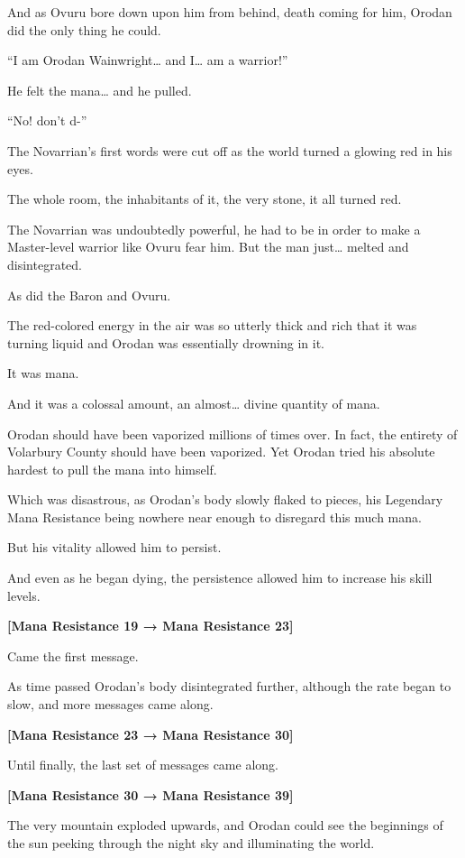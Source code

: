 \documentclass[a4paper,10pt]{book}
\begin{document}
And as Ovuru bore down upon him from behind, death coming for him, Orodan did the only thing he could.\par
“I am Orodan Wainwright… and I… am a warrior!”\par
He felt the mana… and he pulled.\par
“No! don’t d-”\par
The Novarrian’s first words were cut off as the world turned a glowing red in his eyes.\par
The whole room, the inhabitants of it, the very stone, it all turned red.\par
The Novarrian was undoubtedly powerful, he had to be in order to make a Master-level warrior like Ovuru fear him. But the man just… melted and disintegrated.\par
As did the Baron and Ovuru.\par
The red-colored energy in the air was so utterly thick and rich that it was turning liquid and Orodan was essentially drowning in it.\par
It was mana.\par
And it was a colossal amount, an almost… divine quantity of mana.\par
Orodan should have been vaporized millions of times over. In fact, the entirety of Volarbury County should have been vaporized. Yet Orodan tried his absolute hardest to pull the mana into himself.\par
Which was disastrous, as Orodan’s body slowly flaked to pieces, his Legendary Mana Resistance being nowhere near enough to disregard this much mana.\par
But his vitality allowed him to persist.\par
And even as he began dying, the persistence allowed him to increase his skill levels.\par
\textbf{[Mana Resistance 19 → Mana Resistance 23]}\par
Came the first message.\par
As time passed Orodan’s body disintegrated further, although the rate began to slow, and more messages came along.\par
\textbf{[Mana Resistance 23 → Mana Resistance 30]}\par
Until finally, the last set of messages came along.\par
\textbf{[Mana Resistance 30 → Mana Resistance 39]}\par
The very mountain exploded upwards, and Orodan could see the beginnings of the sun peeking through the night sky and illuminating the world.\par
\end{document}
